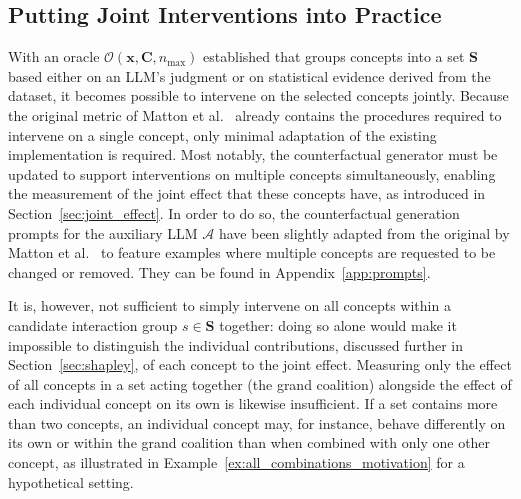 \subsection{Putting Joint Interventions into Practice}

With an oracle $\mathcal{O}(\mathbf{x}, \mathbf{C}, n_{\max})$ established that groups concepts into a set $\mathbf{S}$ based either on an LLM's judgment or on statistical evidence derived from the dataset, it becomes possible to intervene on the selected concepts jointly. Because the original metric of Matton et al.~\cite{mattonWalkTalkMeasuring2024} already contains the procedures required to intervene on a single concept, only minimal adaptation of the existing implementation is required. Most notably, the counterfactual generator must be updated to support interventions on multiple concepts simultaneously, enabling the measurement of the joint effect that these concepts have, as introduced in Section~\ref{sec:joint_effect}. In order to do so, the counterfactual generation prompts for the auxiliary LLM $\mathcal{A}$ have been slightly adapted from the original by Matton et al.~\cite{mattonWalkTalkMeasuring2024} to feature examples where multiple concepts are requested to be changed or removed. They can be found in Appendix~\ref{app:prompts}.

It is, however, not sufficient to simply intervene on all concepts within a candidate interaction group $s \in \mathbf{S}$ together: doing so alone would make it impossible to distinguish the individual contributions, discussed further in Section~\ref{sec:shapley}, of each concept to the joint effect. Measuring only the effect of all concepts in a set acting together (the grand coalition) alongside the effect of each individual concept on its own is likewise insufficient. If a set contains more than two concepts, an individual concept may, for instance, behave differently on its own or within the grand coalition than when combined with only one other concept, as illustrated in Example~\ref{ex:all_combinations_motivation} for a hypothetical setting.

